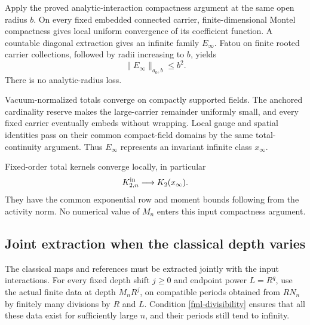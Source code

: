 \documentclass[11pt]{article}
\theoremstyle{remark}
\begin{document}
Apply the proved analytic-interaction compactness argument
at the same open radius \(b\). On every fixed embedded
connected carrier, finite-dimensional Montel compactness
gives local uniform convergence of its coefficient function.
A countable diagonal extraction gives an infinite family
\(E_\infty\). Fatou on finite rooted carrier collections,
followed by radii increasing to \(b\), yields
\begin{equation}
                         \|E_\infty\|_{a_0,b}\le b^2.
 \label{fml-limit-norm}
\end{equation}
There is no analytic-radius loss.

Vacuum-normalized totals converge on compactly supported
fields. The anchored cardinality reserve makes the
large-carrier remainder uniformly small, and every fixed
carrier eventually embeds without wrapping. Local gauge
and spatial identities pass on their common compact-field
domains by the same total-continuity argument. Thus
\(E_\infty\) represents an invariant infinite class
\(x_\infty\).

Fixed-order total kernels converge locally, in particular
\begin{equation}
                K_{2,n}^{\rm in}\longrightarrow K_2(x_\infty).
 \label{fml-input-kernel-limit}
\end{equation}
They have the common exponential row and moment bounds
following from the activity norm. No numerical value of
\(M_n\) enters this input compactness argument.

\subsection{Joint extraction when the classical depth varies}
\label{fml-varying-depth-section}

The classical maps and references must be extracted jointly
with the input interactions. For every fixed depth shift
\(j\ge0\) and endpoint power \(L=R^q\), use the actual finite
data at depth \(M_nR^j\), on compatible periods obtained
from \(RN_n\) by finitely many divisions by \(R\) and \(L\).
Condition \eqref{fml-divisibility} ensures that all these
data exist for sufficiently large \(n\), and their periods
still tend to infinity.
\end{document}
